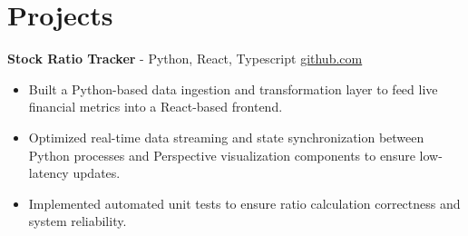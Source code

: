 \documentclass[11pt]{article}       %
\begin{document}

\vspace{-18.5pt}

\section*{Projects}

\textbf{Stock Ratio Tracker}{ - Python, React, Typescript} \hfill \href{https://github.com/Monica20030707/Trading-Dashboard_UI}{github.com} \\
\vspace{-9pt}
\begin{itemize}
  \item Built a Python-based data ingestion and transformation layer to feed live financial metrics into a React-based frontend.
  \item Optimized real-time data streaming and state synchronization between Python processes and Perspective visualization components to ensure low-latency updates.
  \item Implemented automated unit tests to ensure ratio calculation correctness and system reliability.
\end{itemize}

\end{document}
